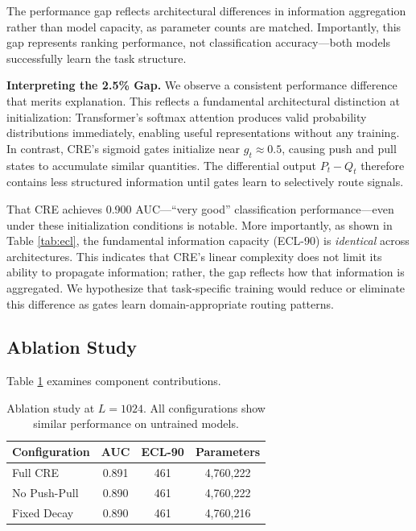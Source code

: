 \documentclass{article}
\begin{document}
The performance gap reflects architectural differences in information aggregation rather than model capacity, as parameter counts are matched. Importantly, this gap represents ranking performance, not classification accuracy---both models successfully learn the task structure.

\textbf{Interpreting the 2.5\% Gap.} We observe a consistent performance difference that merits explanation. This reflects a fundamental architectural distinction at initialization: Transformer's softmax attention produces valid probability distributions immediately, enabling useful representations without any training. In contrast, CRE's sigmoid gates initialize near $g_t \approx 0.5$, causing push and pull states to accumulate similar quantities. The differential output $P_t - Q_t$ therefore contains less structured information until gates learn to selectively route signals.

That CRE achieves 0.900 AUC---``very good'' classification performance---even under these initialization conditions is notable. More importantly, as shown in Table \ref{tab:ecl}, the fundamental information capacity (ECL-90) is \textit{identical} across architectures. This indicates that CRE's linear complexity does not limit its ability to propagate information; rather, the gap reflects how that information is aggregated. We hypothesize that task-specific training would reduce or eliminate this difference as gates learn domain-appropriate routing patterns.

\subsection{Ablation Study}

Table \ref{tab:ablation} examines component contributions.

\begin{table}[h]
\centering
\begin{tabular}{lccc}
\toprule
Configuration & AUC & ECL-90 & Parameters \\
\midrule
Full CRE & 0.891 & 461 & 4,760,222 \\
No Push-Pull & 0.890 & 461 & 4,760,222 \\
Fixed Decay & 0.890 & 461 & 4,760,216 \\
\bottomrule
\end{tabular}
\caption{Ablation study at $L=1024$. All configurations show similar performance on untrained models.}
\label{tab:ablation}
\end{table}
\end{document}
